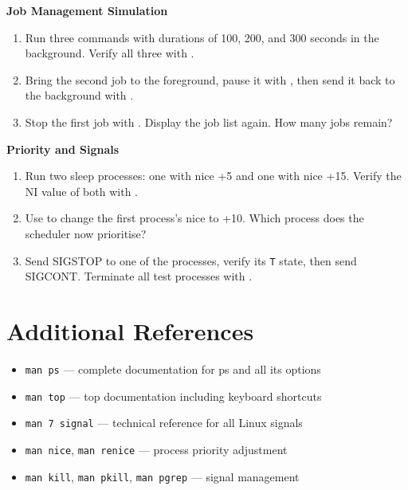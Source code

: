 \begin{exercisebox}[6.B]
  \textbf{Job Management Simulation}
  \begin{enumerate}
    \item Run three  commands with durations of 100, 200, and 300
      seconds in the background. Verify all three with .
    \item Bring the second job to the foreground, pause it with
      , then send it back to the background with .
    \item Stop the first job with . Display the job list again.
      How many jobs remain?
  \end{enumerate}
\end{exercisebox}

\begin{exercisebox}[6.C]
  \textbf{Priority and Signals}
  \begin{enumerate}
    \item Run two sleep processes: one with nice +5 and one with nice +15.
      Verify the NI value of both with .
    \item Use  to change the first process's nice to +10. Which
      process does the scheduler now prioritise?
    \item Send SIGSTOP to one of the processes, verify its \texttt{T} state,
      then send SIGCONT. Terminate all test processes with .
  \end{enumerate}
\end{exercisebox}

\section{Additional References}
\label{sec:process-references}

\begin{itemize}
  \item \texttt{man ps} --- complete documentation for ps and all its options
  \item \texttt{man top} --- top documentation including keyboard shortcuts
  \item \texttt{man 7 signal} --- technical reference for all Linux signals
  \item \texttt{man nice}, \texttt{man renice} --- process priority adjustment
  \item \texttt{man kill}, \texttt{man pkill}, \texttt{man pgrep} --- signal management
\end{itemize}

